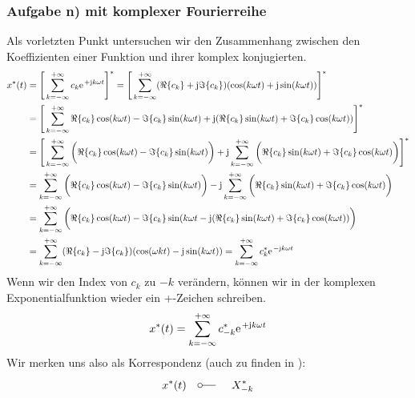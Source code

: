 \documentclass[11pt,a4paper,DIV=12]{scrartcl}
\begin{document}
\subsubsection*{Aufgabe n) mit komplexer Fourierreihe}
Als vorletzten Punkt untersuchen wir den Zusammenhang zwischen den Koeffizienten einer Funktion und ihrer komplex konjugierten.
\begin{align}
	x^*(t)&=\Bigg [\sum_{k=-\infty}^{+\infty}c_k\e^{+\im k \omega t}\Bigg ]^*=\Bigg [\sum_{k=-\infty}^{+\infty}(\Re\{c_k\}+\im\Im\{c_k\})(\cos(k\omega t)+\im\sin(k\omega t))\Bigg ]^*\nonumber \\
	&=\Bigg [\sum_{k=-\infty}^{+\infty}\Re\{c_k\}\cos(k\omega t)-\Im\{c_k\}\sin(k\omega t)+\im (\Re\{c_k\}\sin(k\omega t)+\Im\{c_k\}\cos(k\omega t)) \Bigg ]^*\nonumber \\
	&=\Bigg [\sum_{k=-\infty}^{+\infty}\bigg (\Re\{c_k\}\cos(k\omega t)-\Im\{c_k\}\sin(k\omega t)\bigg )+\im\sum_{k=-\infty}^{+\infty}\bigg (\Re\{c_k\}\sin(k\omega t)+\Im\{c_k\}\cos(k\omega t)\bigg )\Bigg ]^*\nonumber \\
	&=\sum_{k=-\infty}^{+\infty}\bigg (\Re\{c_k\}\cos(k\omega t)-\Im\{c_k\}\sin(k\omega t)\bigg )-\im\sum_{k=-\infty}^{+\infty}\bigg (\Re\{c_k\}\sin(k\omega t)+\Im\{c_k\}\cos(k\omega t)\bigg )\nonumber \\
	&=\sum_{k=-\infty}^{+\infty}\bigg (\Re\{c_k\}\cos(k\omega t)-\Im\{c_k\}\sin(k\omega t-\im(\Re\{c_k\}\sin(k\omega t)+\Im\{c_k\}\cos(k\omega t))\bigg )\nonumber \\
	\label{eq:ComplexConjugatedFourierSeries}
	&=\sum_{k=-\infty}^{+\infty}(\Re\{c_k\}-\im\Im\{c_k\})(\cos(\omega k t)-\im\sin(k\omega t) )=\sum_{k=-\infty}^{+\infty}c_k^*\e^{-\im k \omega t}
\end{align}
Wenn wir den Index von $c_k$ zu $-k$ verändern, können wir in der komplexen Exponentialfunktion wieder ein +-Zeichen schreiben.
\begin{align}
	x^*(t)=\sum_{k=-\infty}^{+\infty}c_{-k}^*\e^{+\im k \omega t}
\end{align}
Wir merken uns also als Korrespondenz (auch zu finden in \cite[Kap. 3, S. 208]{Oppenheim1997}):
\begin{align}
	x^*(t)\quad\fourier\quad X_{-k}^*
\end{align}
\newpage
\end{document}
